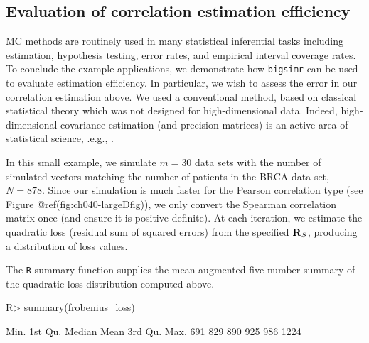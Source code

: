 \documentclass[
]{jss}
\begin{document}
\hypertarget{evaluation-of-correlation-estimation-efficiency}{%
\subsection{Evaluation of correlation estimation
efficiency}\label{evaluation-of-correlation-estimation-efficiency}}

MC methods are routinely used in many statistical inferential tasks
including estimation, hypothesis testing, error rates, and empirical
interval coverage rates. To conclude the example applications, we
demonstrate how \texttt{bigsimr} can be used to evaluate estimation
efficiency. In particular, we wish to assess the error in our
correlation estimation above. We used a conventional method, based on
classical statistical theory which was not designed for high-dimensional
data. Indeed, high-dimensional covariance estimation (and precision
matrices) is an active area of statistical science, .e.g.,
\citep{Won2013g, VanWieringen2016}.

In this small example, we simulate \(m=30\) data sets with the number of
simulated vectors matching the number of patients in the BRCA data set,
\(N=878\). Since our simulation is much faster for the Pearson
correlation type (see Figure @ref(fig:ch040-largeDfig)), we only convert
the Spearman correlation matrix once (and ensure it is positive
definite). At each iteration, we estimate the quadratic loss (residual
sum of squared errors) from the specified \({\bf R}_{S}\), producing a
distribution of loss values.

\begin{CodeChunk}
\end{CodeChunk}

The \texttt{R} summary function supplies the mean-augmented five-number
summary of the quadratic loss distribution computed above.

\begin{CodeChunk}
\begin{CodeInput}
R> summary(frobenius_loss)
\end{CodeInput}
\begin{CodeOutput}
   Min. 1st Qu.  Median    Mean 3rd Qu.    Max. 
    691     829     890     925     986    1224 
\end{CodeOutput}
\end{CodeChunk}
\end{document}
